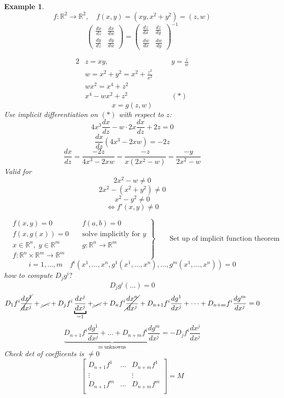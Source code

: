 \documentclass[11pt]{article}
\def\RR{\mathbb{R}}
\newtheorem{example}{Example}[section]
\begin{document}
\begin{example}
\[f: \RR^2 \rightarrow \RR^2, \quad f(x,y) = (xy, x^2 + y^2) = (z,w)\]
\[
\begin{pmatrix}
 \frac{dx}{dz} & \frac{dx}{dw}\\
\frac{dy}{dz} & \frac{dy}{dw}
 \end{pmatrix} =   \begin{pmatrix}
 \frac{dz}{dx} & \frac{dz}{dy}\\
\frac{dw}{dx} & \frac{dw}{dy}
 \end{pmatrix}^{-1} \]

\begin{alignat*}{2}
&z=xy, &\quad &y= \frac{z}{w} \\
&w = x^2 + y^2 = x^2 + \frac{z^2}{x^2} &\quad & \\
&wx^2 = x^4 + z^2 &\quad & \\
& x^4 - wx^2 + z^2 &\quad & (*)
\end{alignat*}
\[x=g(z,w)\]
Use implicit differentiation on $(*)$ with respect to $z$:
\[4x^3\frac{dx}{dz} - w \cdot 2x\frac{dx}{dz} + 2z = 0\]
\[\frac{dx}{dz}(4x^3 - 2xw) = -2z\]
\[\frac{dx}{dz} = \frac{-2z}{4x^3 - 2xw}=  \frac{-z}{x(2x^2 - w)}=  \frac{-y}{2x^2 - w}\]
Valid for
\[2x^2 - w \neq 0 \]
\[2x^2 - (x^2 + y^2) \neq 0 \]
\[x^2 - y^2 \neq 0 \]
\[ \Leftrightarrow f'(x,y) \neq 0\]

\[\left.\begin{aligned}
       & f(x,y) = 0 & \; &f(a,b)= 0 \\
        & f(x,g(x)) = 0 & \; &\text{solve implicitly for $y$} \\
	& x \in \RR^n, \; y \in \RR^m & \; & g:\RR^n \rightarrow \RR^m\\
	&f:\RR^n \times \RR^m \rightarrow \RR^m &\; & 
       \end{aligned}
 \right\}
 \qquad \text{Set up of implicit function theorem }\]
\[i=1,\dots,m \quad f^{i}(x^1 , \dots , x^n , g^1(x^1, \dots, x^n), \dots, g^m(x^1, \dots, x^n)) =0\]
how to compute $D_{j}g^{i}?$
\[D_{j}g^{i}(\dots) = 0\]
\[D_{1}f^i\cancel{\frac{dx^1}{dx^j}} + \cancel{\dots} +  D_{j}f^i\underbracket{\frac{dx^j}{dx^j}}_{= 1} + \cancel{\dots} + D_{n}f^i\cancel{\frac{dx^n}{dx^j}}+D_{n+1}f^i\frac{dg^1}{dx^j} + \dots + D_{n+m}f^i\frac{dg^m}{dx^j}=0\]
\[\underbrace{D_{n+1}f^i\frac{dg^1}{dx^j} + \dots + D_{n+m}f^i\frac{dg^m}{dx^j}}_{m \; \text{unknowns}}= - D_{j}f^i\frac{dx^j}{dx^j} \]
Check det of coefficents is $\neq 0$ 
\[\left[\begin{array}{ccc}
D_{n+1}f^1 & \dots & D_{n+m}f^1\\
\vdots & & \vdots\\
D_{n+1}f^m & \dots & D_{n+m}f^m\\
\end{array} \right] = M\]
\end{example}
\end{document}
